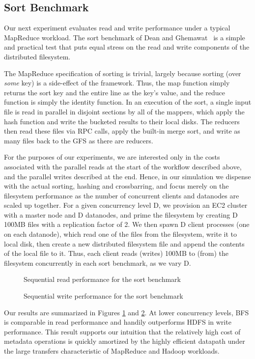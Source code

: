 \documentclass{article}
\begin{document}
\subsection{Sort Benchmark}
Our next experiment evaluates read and write performance under a
typical MapReduce workload.  The sort benchmark of Dean and
Ghemawat~\cite{mapreduce} is a simple and practical test that puts
equal stress on the read and write components of the distributed
filesystem.

The MapReduce specification of sorting is trivial, largely because
sorting (over \emph{some} key) is a side-effect of the framework.
Thus, the map function simply returns the sort key and the entire line
as the key's value, and the reduce function is simply the identity
function.  In an execution of the sort, a single input file is read in
parallel in disjoint sections by all of the mappers, which apply the
hash function and write the bucketed results to their local disks.
The reducers then read these files via RPC calls, apply the built-in
merge sort, and write as many files back to the GFS as there are
reducers.

For the purposes of our experiments, we are interested only in the
costs associated with the parallel reads at the start of the workflow
described above, and the parallel writes described at the end.  Hence,
in our simulation we dispense with the actual sorting, hashing and
crossbarring, and focus merely on the filesystem performance as the
number of concurrent clients and datanodes are scaled up together.
For a given concurrency level D, we provision an EC2 cluster with a
master node and D datanodes, and prime the filesystem by creating D
100MB files with a replication factor of 2.  We then spawn D client
processes (one on each datanode), which read one of the files from the
filesystem, write it to local disk, then create a new distributed
filesystem file and append the contents of the local file to it.
Thus, each client reads (writes) 100MB to (from) the filesystem
concurrently in each sort benchmark, as we vary D.

\begin{figure}
\centering
{}
\caption{Sequential read performance for the sort benchmark}
\label{fig:big-read-perf}
\end{figure}
\begin{figure}
\centering
{}
\caption{Sequential write performance for the sort benchmark}
\label{fig:big-write-perf}
\end{figure}
Our results are summarized in Figures \ref{fig:big-read-perf} and
\ref{fig:big-write-perf}.  At lower concurrency levels, BFS is
comparable in read performance and handily outperforms HDFS in write
performance.  This result supports our intuition that the relatively
high cost of metadata operations is quickly amortized by the highly
efficient datapath under the large transfers characteristic of
MapReduce and Hadoop workloads.
\end{document}
